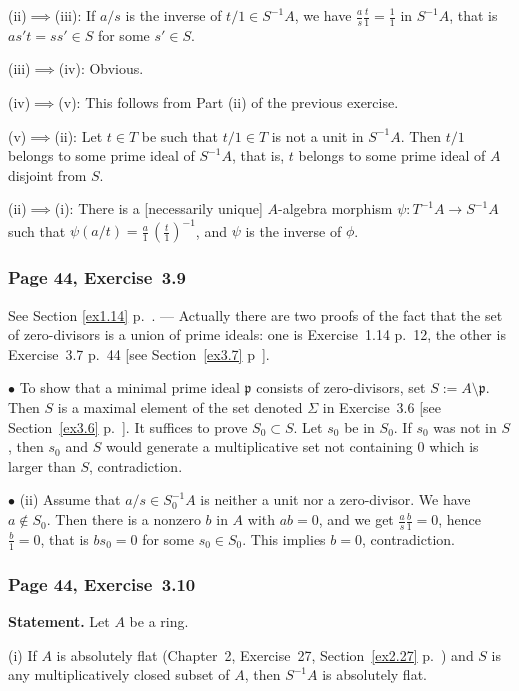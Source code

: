 \documentclass[12pt,letterpaper]{article}%
\newcommand{\mf}{\mathfrak}
\newcommand{\ppp}{\mf p}
\newcommand{\bu}{\bullet}
\newcommand{\nn}{\noindent}
\begin{document}
\nn(ii)$\implies$(iii): If $a/s$ is the inverse of $t/1\in S^{-1}A$, we have $\frac as\frac t1=\frac11$ in $S^{-1}A$, that is $as't=ss'\in S$ for some $s'\in S$.

\nn(iii)$\implies$(iv): Obvious.

\nn(iv)$\implies$(v): This follows from Part (ii) of the previous exercise.

\nn(v)$\implies$(ii): Let $t\in T$ be such that $t/1\in T$ is not a unit in $S^{-1}A$. Then $t/1$ belongs to some prime ideal of $S^{-1}A$, that is, $t$ belongs to some prime ideal of $A$ disjoint from $S$.

\nn(ii)$\implies$(i): There is a [necessarily unique] $A$-algebra morphism $\psi:T^{-1}A\to S^{-1}A$ such that $\psi(a/t)=\frac a1\,(\frac t1)^{-1}$, and $\psi$ is the inverse of $\phi$.

\subsubsection{Page 44, Exercise~3.9}%

See Section \ref{ex1.14} p.~\pageref{ex1.14}. --- Actually there are two proofs of the fact that the set of zero-divisors  is a union of prime ideals: one is Exercise~1.14 p.~12, the other is Exercise~3.7 p.~44 [see Section~\ref{ex3.7} p~\pageref{ex3.7}]. 

\nn$\bu$ To show that a minimal prime ideal $\ppp$ consists of zero-divisors, set $S:=A\setminus\ppp$. Then $S$ is a maximal element of the set denoted $\Sigma$ in Exercise~3.6 [see Section~\ref{ex3.6} p.~\pageref{ex3.6}]. It suffices to prove $S_0\subset S$. Let $s_0$ be in $S_0$. If $s_0$ was not in $S$, then $s_0$ and $S$ would generate a multiplicative set not containing $0$ which is larger than $S$, contradiction. 

\nn$\bu$ (ii) Assume that $a/s\in S_0^{-1}A$ is neither a unit nor a zero-divisor. We have $a\notin S_0$. Then there is a nonzero $b$ in $A$ with $ab=0$, and we get $\frac as\frac b1=0$, hence $\frac b1=0$, that is $bs_0=0$ for some $s_0\in S_0$. This implies $b=0$, contradiction.

\subsubsection{Page 44, Exercise~3.10}\label{ex3.10}%

\textbf{Statement.} Let $A$ be a ring.

\nn(i) If $A$ is absolutely flat (Chapter~2, Exercise~27, Section~\ref{ex2.27} p.~\pageref{ex2.27}) and $S$ is any multiplicatively closed subset of $A$, then $S^{-1}A$ is absolutely flat.
\end{document}

